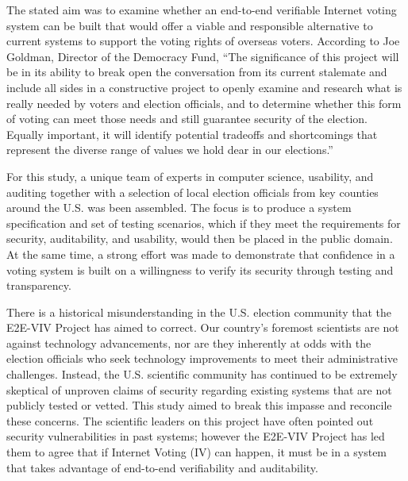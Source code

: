 The stated aim was to examine whether an end-to-end verifiable
Internet voting system can be built that would offer a viable and
responsible alternative to current systems to support the voting
rights of overseas voters. According to Joe Goldman, Director of the
Democracy Fund, ``The significance of this project will be in its
ability to break open the conversation from its current stalemate and
include all sides in a constructive project to openly examine and
research what is really needed by voters and election officials, and
to determine whether this form of voting can meet those needs and
still guarantee security of the election. Equally important, it will
identify potential tradeoffs and shortcomings that represent the
diverse range of values we hold dear in our elections.'' 

For this study, a unique team of experts in computer science,
usability, and auditing together with a selection of local election
officials from key counties around the U.S. was been assembled. The
focus is to produce a system specification and set of testing
scenarios, which if they meet the requirements for security,
auditability, and usability, would then be placed in the public
domain. At the same time, a strong effort was made to demonstrate that
confidence in a voting system is built on a willingness to verify its
security through testing and transparency.

There is a historical misunderstanding in the U.S. election community
that the E2E-VIV Project has aimed to correct. Our country's foremost
scientists are not against technology advancements, nor are they
inherently at odds with the election officials who seek technology
improvements to meet their administrative challenges. Instead, the
U.S. scientific community has continued to be extremely skeptical of unproven claims of
security regarding existing systems that are not publicly tested or
vetted. This study aimed to break this impasse and reconcile these
concerns. The scientific leaders on this project have often pointed out
security vulnerabilities in past systems; however the E2E-VIV Project
has led them to agree that if Internet Voting (IV) can happen, it must
be in a system that takes advantage of end-to-end verifiability and
auditability.


